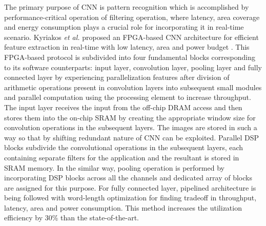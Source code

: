 \documentclass[journal]{IEEEtran}
\begin{document}
\par The primary purpose of CNN is pattern recognition which is accomplished by performance-critical operation of filtering operation, where latency, area coverage and energy consumption plays a crucial role for incorporating it in real-time scenario. Kyriakos \textit{et al.} proposed an FPGA-based CNN architecture for efficient feature extraction in real-time with low latency, area and power budget \cite{paper31}. This FPGA-based protocol is subdivided into four fundamental blocks corresponding to its software counterparts: input layer, convolution layer, pooling layer and fully connected layer by experiencing parallelization features after division of arithmetic operations present in convolution layers into subsequent small modules and parallel computation using the processing element to increase throughput. The input layer receives the input from the off-chip DRAM access and then stores them into the on-chip SRAM by creating the appropriate window size for convolution operations in the subsequent layers. The images are stored in such a way so that by shifting redundant nature of CNN can be exploited. Parallel DSP blocks subdivide the convolutional operations in the subsequent layers, each containing separate filters for the application and the resultant is stored in SRAM memory. In the similar way, pooling operation is performed by incorporating DSP blocks across all the channels and dedicated array of blocks are assigned for this purpose. For fully connected layer, pipelined architecture is being followed with word-length optimization for finding tradeoff in throughput, latency, area and power consumption. This method increases the utilization efficiency by 30\% than the state-of-the-art. 
\end{document}
